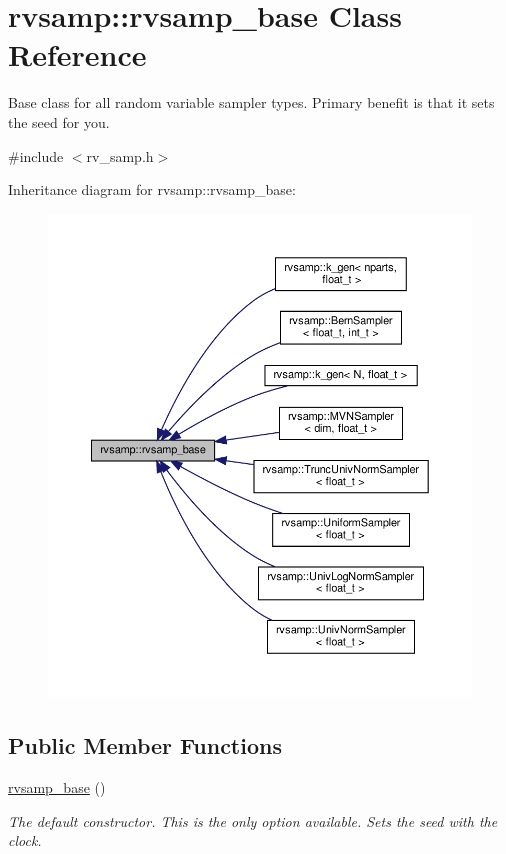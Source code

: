 \hypertarget{classrvsamp_1_1rvsamp__base}{}\section{rvsamp\+:\+:rvsamp\+\_\+base Class Reference}
\label{classrvsamp_1_1rvsamp__base}


Base class for all random variable sampler types. Primary benefit is that it sets the seed for you.  




{\ttfamily \#include $<$rv\+\_\+samp.\+h$>$}



Inheritance diagram for rvsamp\+:\+:rvsamp\+\_\+base\+:\nopagebreak
\begin{figure}[H]
\begin{center}
\leavevmode
\includegraphics[width=350pt]{classrvsamp_1_1rvsamp__base__inherit__graph}
\end{center}
\end{figure}
\subsection*{Public Member Functions}
\begin{DoxyCompactItemize}
\item 
\mbox{\label{classrvsamp_1_1rvsamp__base_ab20e90775a57b9a142520f236b39e7c1}} 
\hyperlink{classrvsamp_1_1rvsamp__base_ab20e90775a57b9a142520f236b39e7c1}{rvsamp\+\_\+base} ()
\begin{DoxyCompactList}\small\item\em The default constructor. This is the only option available. Sets the seed with the clock. \end{DoxyCompactList}\end{DoxyCompactItemize}
